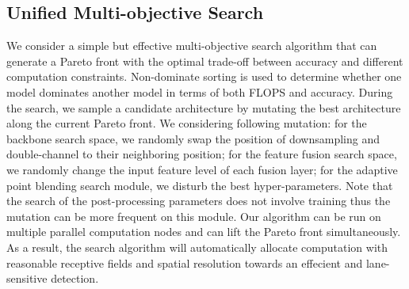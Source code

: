 \documentclass[runningheads]{llncs}
\begin{document}
\subsection{Unified Multi-objective Search}

We consider a simple but effective multi-objective search algorithm
that can generate a Pareto front with the optimal trade-off between
accuracy and different computation constraints. Non-dominate sorting
is used to determine whether one model dominates another model in
terms of both FLOPS and accuracy. During the search, we sample a candidate
architecture by mutating the best architecture along the current Pareto
front. We considering following mutation: for the backbone search
space, we randomly swap the position of downsampling and double-channel
to their neighboring position; for the feature fusion search space,
we randomly change the input feature level of each fusion layer; for
the adaptive point blending search module, we disturb the best hyper-parameters.
Note that the search of the post-processing parameters does not involve
training thus the mutation can be more frequent on this module. Our
algorithm can be run on multiple parallel computation nodes and can
lift the Pareto front simultaneously. As a result, the search algorithm
will automatically allocate computation with reasonable receptive
fields and spatial resolution towards an effecient and lane-sensitive
detection. 
\end{document}
